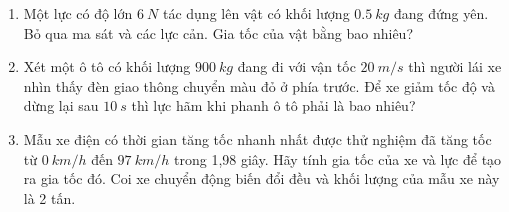 \setcounter{section}{0}

\begin{enumerate}[label=\bfseries Câu \arabic*:]
		\item {}
	
	{
		
		Một lực có độ lớn $\SI{6}{N}$ tác dụng lên vật có khối lượng $\SI{0,5}{kg}$ đang đứng yên. Bỏ qua ma sát và các lực cản. Gia tốc của vật bằng bao nhiêu?
		
	}
	
	\item {}
	
	{
		Xét một ô tô có khối lượng $\SI{900}{kg}$ đang đi với vận tốc $\SI{20}{m/s}$ thì người lái xe nhìn thấy đèn giao thông chuyển màu đỏ ở phía trước. Để xe giảm tốc độ và dừng lại sau $\SI{10}{s}$ thì lực hãm khi phanh ô tô phải là bao nhiêu?
	}
	
	
	\item {}
	
	{
		
		Mẫu xe điện có thời gian tăng tốc nhanh nhất được thử nghiệm đã tăng tốc từ $\SI{0}{km/h}$ đến $\SI{97}{km/h}$ trong 1,98 giây. Hãy tính gia tốc của xe và lực để tạo ra gia tốc đó. Coi xe chuyển động biến đổi đều và khối lượng của mẫu xe này là 2 tấn.
	}
	
\end{enumerate}
